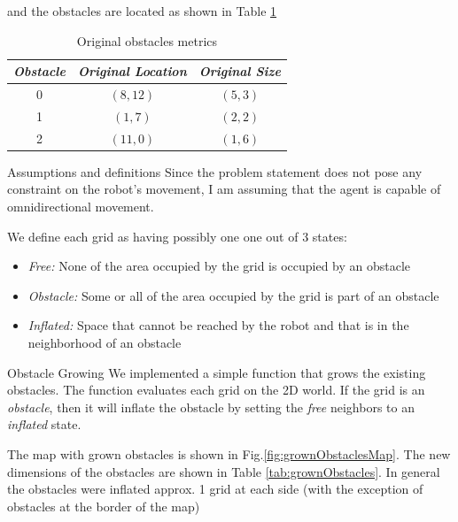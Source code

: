 \documentclass[conference]{IEEEtran}
\makeatletter
\renewcommand\section{\@startsection{section}{1}{\z@}
                                  {-3.0ex plus -1.5ex minus -0.5ex}
                                  {0.7ex plus 1ex minus 0ex}
                                  {\bfseries}}
\renewcommand\subsection{\@startsection{subsection}{1}{\z@}
                                  {-2.0ex plus -1.5ex minus -0.5ex}
                                  {0.7ex plus 1ex minus 0ex}
                                  {\itshape\bfseries}}
\makeatother
\begin{document}
and the obstacles are located as shown in Table \ref{tab:originalobstacles}

\begin{table}[h]
\centering
\caption{Original obstacles metrics}
\begin{tabular}{|c|c|c|}
\hline 
\textit{ \textbf{Obstacle}} & \textit{ \textbf{Original Location}} & \textit{ \textbf{Original Size}}\\
\hline 
0 & $(8, 12)$ & $(5, 3)$ \\
1 & $(1, 7)$ & $(2, 2)$ \\
2 & $(11, 0)$ & $(1, 6)$ \\ 
\hline
\end{tabular}
\label{tab:originalobstacles}
\end{table} 


\subsection{Assumptions and definitions}
Since the problem statement does not pose any constraint on 
the robot's movement, I am assuming that the agent is capable
of omnidirectional movement.

We define each grid as having possibly one one out of 3 states:
\begin{itemize}
\item{ \textit{Free:} None of the area occupied by the grid is occupied 
by an obstacle}
\item{ \textit{Obstacle:} Some or all of the area occupied by the grid 
is part of an obstacle}
\item{ \textit{Inflated:} Space that cannot be reached by the robot and 
that is in the neighborhood of an obstacle}
\end{itemize}

\section{Obstacle Growing}
\label{sec:obstacleGrowing}
We implemented a simple function that grows the existing obstacles.
The function evaluates each grid on the 2D world. If the grid is
an \textit{obstacle}, then it will inflate the obstacle by setting 
the \textit{free} neighbors to an \textit{inflated} state.

The map with grown obstacles is shown in Fig.\ref{fig:grownObstaclesMap}.
The new dimensions of the obstacles are shown in Table \ref{tab:grownObstacles}.
In general the obstacles were inflated approx. 1 grid at each side (with the exception
of obstacles at the border of the map)
\end{document}
